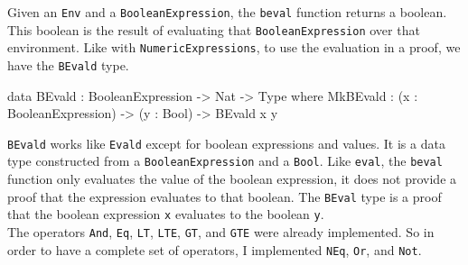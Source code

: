         Given an \texttt{Env} and a \texttt{BooleanExpression}, the \texttt{beval} function returns a boolean. This boolean is the result of evaluating that \texttt{BooleanExpression} over that environment. Like with \texttt{NumericExpressions}, to use the evaluation in a proof, we have the \texttt{BEvald} type.
        \begin{code}[caption={\texttt{BEvald} as defined in the \Idris model}]
data BEvald : BooleanExpression -> Nat -> Type where
    MkBEvald : (x : BooleanExpression) -> (y : Bool) -> BEvald x y
        \end{code}
        \texttt{BEvald} works like \texttt{Evald} except for boolean expressions and values. It is a data type constructed from a \texttt{BooleanExpression} and a \texttt{Bool}. Like \texttt{eval}, the \texttt{beval} function only evaluates the value of the boolean expression, it does not provide a proof that the expression evaluates to that boolean. The \texttt{BEval} type is a proof that the boolean expression \texttt{x} evaluates to the boolean \texttt{y}.
        \\
        
        The operators \texttt{And}, \texttt{Eq}, \texttt{LT}, \texttt{LTE}, \texttt{GT}, and \texttt{GTE} were already implemented. So in order to have a complete set of operators, I implemented \texttt{NEq}, \texttt{Or}, and \texttt{Not}.

